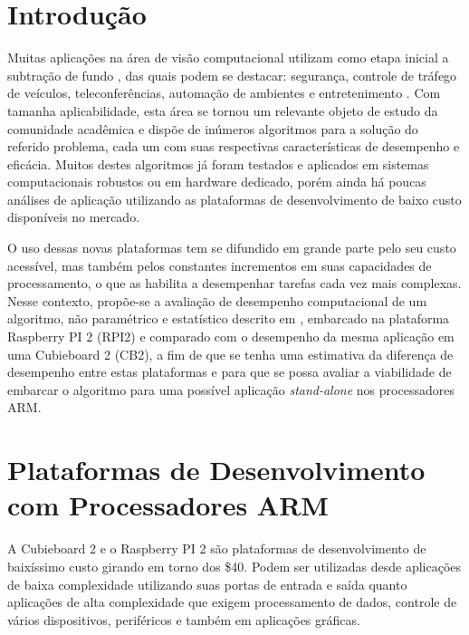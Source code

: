 \documentclass[conference]{IEEEtran}
\begin{document}
\IEEEpeerreviewmaketitle



\section{Introdução}
Muitas aplicações na área de visão computacional utilizam como etapa inicial a subtração de fundo \cite{IEEEhowto:sobral}, das quais podem se destacar: segurança, controle de tráfego de veículos, teleconferências, automação de ambientes e entretenimento \cite{IEEEhowto:parolin}. Com tamanha aplicabilidade, esta área se tornou um relevante objeto de estudo da comunidade acadêmica e dispõe de inúmeros algoritmos para a solução do referido problema, cada um com suas respectivas características de desempenho e eficácia. Muitos destes algoritmos já foram testados e aplicados em sistemas computacionais robustos ou em hardware dedicado\cite{IEEEhowto:oliveira}, porém ainda há poucas análises de aplicação utilizando as plataformas de desenvolvimento de baixo custo disponíveis no mercado.

O uso dessas novas plataformas tem se difundido em grande parte pelo seu custo acessível, mas também pelos constantes incrementos em suas capacidades de processamento, o que as habilita a desempenhar tarefas cada vez mais complexas. Nesse contexto, propõe-se a avaliação de desempenho computacional de um algoritmo, não paramétrico e estatístico descrito em \cite{IEEEhowto:horprasert}, embarcado na plataforma Raspberry PI 2 (RPI2) e comparado com o desempenho da mesma aplicação em uma Cubieboard 2 (CB2), a fim de que se tenha uma estimativa da diferença de desempenho entre estas plataformas e para que se possa avaliar a viabilidade de embarcar o algoritmo para uma possível aplicação \textit{stand-alone} nos processadores ARM.


\section{Plataformas de Desenvolvimento com Processadores ARM}

A Cubieboard 2 e o Raspberry PI 2 são plataformas de desenvolvimento de baixíssimo custo girando em torno dos \$40. Podem ser utilizadas desde aplicações de baixa complexidade utilizando suas portas de entrada e saída quanto aplicações  de alta complexidade que exigem processamento de dados, controle de vários dispositivos, periféricos e também em aplicações gráficas.
\end{document}
